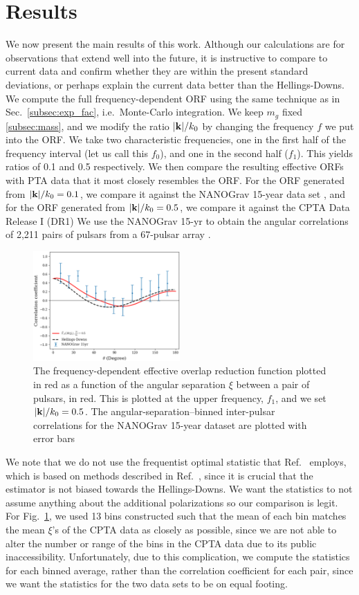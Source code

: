\documentclass[prd,aps,psfig,nofootinbib,nobibnotes,superscriptaddress,preprintnumbers,times]{revtex4-2}\setlength{\topmargin}{-14mm}
\begin{document}
\section{Results}\label{sec:results}
We now present the main results of this work. Although our calculations are for observations that extend well into the future, it is instructive to compare to current data and confirm whether they are within the present standard deviations, or perhaps explain the current data better than the Hellings-Downs. We compute the full frequency-dependent ORF using the same technique as in Sec.\ \ref{subsec:exp_fac}, i.e.\ Monte-Carlo integration. We keep $m_g$ fixed \ref{subsec:mass}, and we modify the ratio $|{\bf k}|/k_0$ by changing the frequency $f$ we put into the ORF. We take two characteristic frequencies, one in the first half of the frequency interval (let us call this $f_0$), and one in the second half ($f_1$). This yields ratios of 0.1 and 0.5 respectively. We then compare the resulting effective ORFs with PTA data that it most closely resembles the ORF. For the ORF generated from $|{\bf k}|/k_0 = 0.1$, we compare it against the NANOGrav 15-year data set \cite{Agazie:2023}, and for the ORF generated from $|{\bf k}|/k_0 = 0.5$, we compare it against the CPTA Data Release I (DR1) We use the NANOGrav 15-yr to obtain the angular correlations of 2,211 pairs of pulsars from a 67-pulsar array \cite{Agazie:2023}. 
\begin{figure}[h]
    \centering
    \includegraphics[width=0.5\textwidth]{fig2.pdf}
    \caption{The frequency-dependent effective overlap reduction function plotted in red as a function of the angular separation $\xi$ between a pair of pulsars, in red. This is plotted at the upper frequency, $f_1$, and we set $|{\bf k}|/k_0 = 0.5$. The angular-separation–binned inter-pulsar correlations for the NANOGrav 15-year dataset are plotted with error bars}
    \label{fig:ng}
\end{figure}
We note that we do not use the frequentist optimal statistic that Ref.\ \cite{Agazie:2023} employs, which is based on methods described in Ref.\ \cite{Allen:2022ksj}, since it is crucial that the estimator is not biased towards the Hellings-Downs. We want the statistics to not assume anything about the additional polarizations so our comparison is legit. For Fig.\ \ref{fig:ng}, we used 13 bins constructed such that the mean of each bin matches the mean $\xi$'s of the CPTA data as closely as possible, since we are not able to alter the number or range of the bins in the CPTA data due to its public inaccessibility. Unfortunately, due to this complication, we compute the statistics for each binned average, rather than the correlation coefficient for each pair, since we want the statistics for the two data sets to be on equal footing. 
\end{document}
